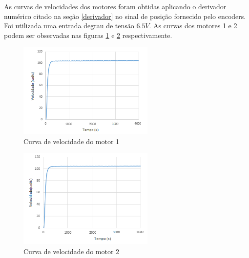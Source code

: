 \documentclass[]{politex}
\begin{document}
As curvas de velocidades dos motores foram obtidas aplicando o derivador numérico citado na seção \ref{derivador} no sinal de posição fornecido pelo encoders. Foi utilizada uma entrada degrau de tensão $6.5V$. As curvas dos motores 1 e 2 podem ser observadas nas figuras \ref{CM2} e \ref{CM3} respectivamente.
 \begin{figure}[H]
     \centering
     \includegraphics[width=0.6\textwidth]{imagens/velMotor1.png}
     \caption{Curva de velocidade do motor 1}
     \label{CM2}
 \end{figure}
 \begin{figure}[H]
     \centering
     \includegraphics[width=0.6\textwidth]{imagens/velMotor2.png}
     \caption{Curva de velocidade do motor 2}
     \label{CM3}
 \end{figure}
\end{document}

